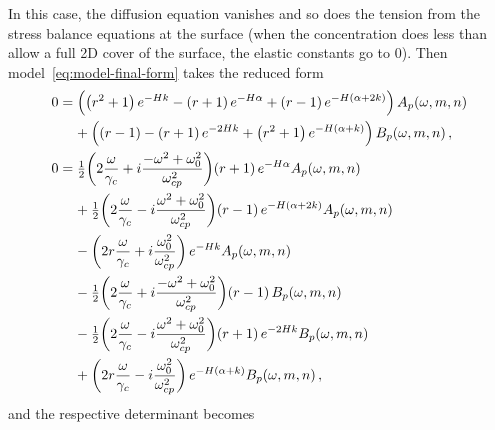 \documentclass[reqno]{amsart}
\numberwithin{equation}{section}
\numberwithin{figure}{section}
\begin{document}
In this case, the diffusion equation vanishes and so does the tension from the stress balance equations at the surface (when the concentration does less than allow a full 2D cover of the surface, the elastic constants go to $0$). Then model~\eqref{eq:model-final-form} takes the reduced form
\begin{align*}
0
  &= \left(\left(r^{2}+1\right)e^{-\aHeight k}-\left(r+1\right)e^{-\aHeight\alpha}+\left(r-1\right)e^{-\aHeight\left(\alpha+2k\right)}\right)A_{p}\!\left(\omega,m,n\right) \\
  &\phantom{=}\,\,+\left(\left(r-1\right)-\left(r+1\right)e^{-2\aHeight k}+\left(r^{2}+1\right)e^{-\aHeight\left(\alpha+k\right)}\right)B_{p}\!\left(\omega,m,n\right), \\
0
  &= \tfrac{1}{2}\!\left(2\frac{\omega}{\gamma_{c}}+i\frac{-\omega^{2}+\omega_{0}^{2}}{\omega_{cp}^{2}}\right)\!\left(r+1\right)e^{-\aHeight\alpha}A_{p}\!\left(\omega,m,n\right) \\
  &\phantom{=}\,\,+\tfrac{1}{2}\!\left(2\frac{\omega}{\gamma_{c}}-i\frac{\omega^{2}+\omega_{0}^{2}}{\omega_{cp}^{2}}\right)\!\left(r-1\right)e^{-\aHeight\left(\alpha+2k\right)}A_{p}\!\left(\omega,m,n\right) \\
  &\phantom{=}\,\,-\left(2r\frac{\omega}{\gamma_{c}}+i\frac{\omega_{0}^{2}}{\omega_{cp}^{2}}\right)e^{-\aHeight k}A_{p}\!\left(\omega,m,n\right) \\
  &\phantom{=}\,\,-\tfrac{1}{2}\!\left(2\frac{\omega}{\gamma_{c}}+i\frac{-\omega^{2}+\omega_{0}^{2}}{\omega_{cp}^{2}}\right)\!\left(r-1\right)B_{p}\!\left(\omega,m,n\right) \\
  &\phantom{=}\,\,-\tfrac{1}{2}\!\left(2\frac{\omega}{\gamma_{c}}-i\frac{\omega^{2}+\omega_{0}^{2}}{\omega_{cp}^{2}}\right)\!\left(r+1\right)e^{-2\aHeight k}B_{p}\!\left(\omega,m,n\right) \\
  &\phantom{=}\,\,+\left(2r\frac{\omega}{\gamma_{c}}-i\frac{\omega_{0}^{2}}{\omega_{cp}^{2}}\right)e^{-\aHeight\left(\alpha+k\right)}B_{p}\!\left(\omega,m,n\right),
\end{align*}
and the respective determinant becomes
\end{document}
